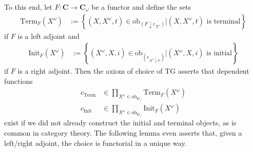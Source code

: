 To this end, let $F \colon \mathbf{C} \rightarrow \mathbf{C}_{\omega}$ be a functor and define the sets
\begin{align*}
  \mathrm{Term}_{F}(X^{\omega})
  &:=
  \left\lbrace
      (X,X^{\omega},t)
      \in
      \mathrm{ob}_{(F \downarrow \mathrm{c}_{X^{\omega}})}
    \vert
      (X,X^{\omega},t)
      \text{ is terminal}
  \right\rbrace
\end{align*}
if $F$ is a left adjoint and
\begin{align*}
  \mathrm{Init}_{F}(X^{\omega})
  &:=
  \left\lbrace
      (X^{\omega},X,i)
      \in
      \mathrm{ob}_{(\mathrm{c}_{X^{\omega} \downarrow F})}
    \vert
      (X^{\omega},X,i)
      \text{ is initial}
  \right\rbrace
\end{align*}
if $F$ is a right adjoint.
Then the axiom of choice of TG asserts that dependent functions
\begin{align*}
  c_{\mathrm{Term}}
  &\in
  \prod_{X^{\omega} \in \mathrm{ob}_{\mathbf{C}_{\omega}}}
  \mathrm{Term}_{F}(X^{\omega})
  \\
  c_{\mathrm{Init}}
  &\in
  \prod_{X^{\omega} \in \mathrm{ob}_{\mathbf{C}_{\omega}}}
  \mathrm{Init}_{F}(X^{\omega})
\end{align*}
exist if we did not already construct the initial and terminal objects, as is common in category theory.
The following lemma even asserts that, given a left/right adjoint, the choice is functorial in a unique way.
\\
